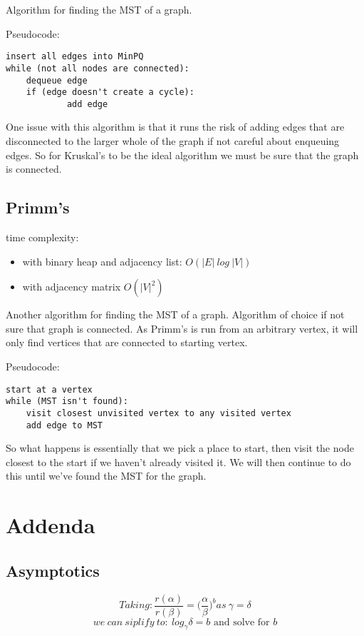 \documentclass[12pt, letterpaper]{article}
\begin{document}
Algorithm for finding the MST of a graph. 

Pseudocode: 
\begin{verbatim}
insert all edges into MinPQ
while (not all nodes are connected):
    dequeue edge
    if (edge doesn't create a cycle):
    	    add edge
\end{verbatim}
One issue with this algorithm is that it runs the risk of adding edges that are disconnected to the larger whole of the graph if not careful about enqueuing edges. So for Kruskal's to be the ideal algorithm we must be sure that the graph is connected.
\subsection{Primm's}
time complexity: 
\begin{itemize}
\item with binary heap and adjacency list: $O (|E|\ log\ |V|)$
\item with adjacency matrix $O (|V|^2)$
\end{itemize}


Another algorithm for finding the MST of a graph. Algorithm of choice if not sure that graph is connected. As Primm's is run from an arbitrary vertex, it will only find vertices that are connected to starting vertex. 

Pseudocode:
\begin{verbatim}
start at a vertex
while (MST isn't found):
    visit closest unvisited vertex to any visited vertex
    add edge to MST
\end{verbatim}
So what happens is essentially that we pick a place to start, then visit the node closest to the start if we haven't already visited it. We will then continue to do this until we've found the MST for the graph.
\section{Addenda}
\subsection{Asymptotics}

\begin{equation}
Taking:
\frac{r(\alpha)}{r(\beta)} = \bigg(\frac{\alpha}{\beta}\bigg)^b as\ \gamma = \delta
\end{equation}
\begin{equation}
we\ can\ siplify\ to:\ log_\gamma \delta = b \textrm{ and solve for $b$}
\end{equation}
\end{document}
